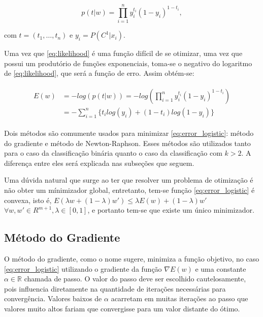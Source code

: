 \begin{center}
	\begin{equation}
		\label{eq:likelihood}
		p(t | w) = \prod_{i = 1}^n y_i^{t_i}(1 - y_i)^{1 - t_i}	,
	\end{equation}
\end{center}
com $t = (t_1, \ldots, t_n)$ e $y_i = P(C^1 | x_i)$.

Uma vez que \ref{eq:likelihood} é uma função difícil de se otimizar, uma vez que possui um
produtório de funções exponenciais, toma-se o negativo do logaritmo de \ref{eq:likelihood},
que será a função de erro. Assim obtém-se:

\begin{center}
		\begin{align}
		\begin{split}
			\label{eq:error_logistic}
			E(w) &= - log(p(t | w)) = -log(\prod_{i = 1}^n y_i^{t_i}(1 - y_i)^{1 - t_i}	) \\
		 	&= - \sum_{i = 1}^{n} \{t_i log(y_i) + (1 - t_i) log(1 - y_i)\} 
		\end{split}
		\end{align}
\end{center}

Dois métodos são comumente usados para minimizar \ref{eq:error_logistic}: 
método do gradiente e método de Newton-Raphson. Esses métodos são utilizados tanto para o caso da classificação binária quanto o caso da classificação com $k > 2$. A diferença entre eles será explicada
nas subseções que seguem.

Uma dúvida natural que surge ao ter que resolver um problema de otimização é não
obter um mínimizador global, entretanto, tem-se
função \ref{eq:error_logistic} é convexa, isto é, $E(\lambda w + (1 - \lambda ) w') \leq \lambda E(w) 
	+ (1 - \lambda ) w'$
 $\forall w, w' \in R^{m + 1}, \lambda \in [0, 1]$, e portanto tem-se que existe um único minimizador.


\subsection{Método do Gradiente}\label{subsec:grad_descent}

O método do gradiente, como o nome sugere, minimiza a função objetivo, no caso \ref{eq:error_logistic}
utilizando o gradiente da função $\nabla E(w)$ e uma constante $\alpha \in \mathbb{R}$ chamada de
passo. O valor do passo deve ser escolhido cautelosamente, pois influencia diretamente na quantidade
de iterações necessárias para convergência. Valores baixos de $\alpha$ acarretam em muitas iterações
ao passo que valores muito altos fariam que convergisse para um valor distante do ótimo. 

